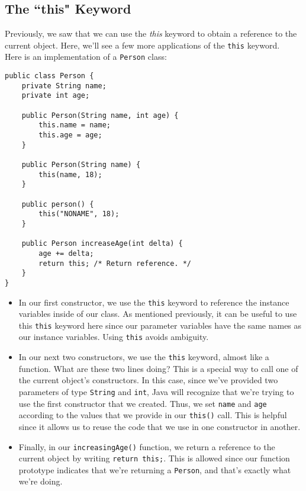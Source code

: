 \subsection{The ``this" Keyword}

Previously, we saw that we can use the \textit{this} keyword to obtain a reference to the current object. Here, we'll see a few more applications of the \verb!this! keyword. \\

Here is an implementation of a \verb!Person! class:

\begin{lstlisting}
public class Person {
    private String name;
    private int age;
    
    public Person(String name, int age) {
        this.name = name;
        this.age = age;
    }
    
    public Person(String name) {
        this(name, 18);
    }
    
    public person() {
        this("NONAME", 18);
    }
    
    public Person increaseAge(int delta) {
        age += delta;
        return this; /* Return reference. */
    }
}
\end{lstlisting}

\begin{itemize}
    \item In our first constructor, we use the \verb!this! keyword to reference the instance variables inside of our class. As mentioned previously, it can be useful to use this \verb!this! keyword here since our parameter variables have the same names as our instance variables. Using \verb!this! avoids ambiguity. 
    \item In our next two constructors, we use the \verb!this! keyword, almost like a function. What are these two lines doing? This is a special way to call one of the current object's constructors. In this case, since we've provided two parameters of type \verb!String! and \verb!int!, Java will recognize that we're trying to use the first constructor that we created. Thus, we set \verb!name! and \verb!age! according to the values that we provide in our \verb!this()! call. This is helpful since it allows us to reuse the code that we use in one constructor in another.
    \item Finally, in our \verb!increasingAge()! function, we return a reference to the current object by writing \verb!return this;!. This is allowed since our function prototype indicates that we're returning a \verb!Person!, and that's exactly what we're doing. 
\end{itemize}


